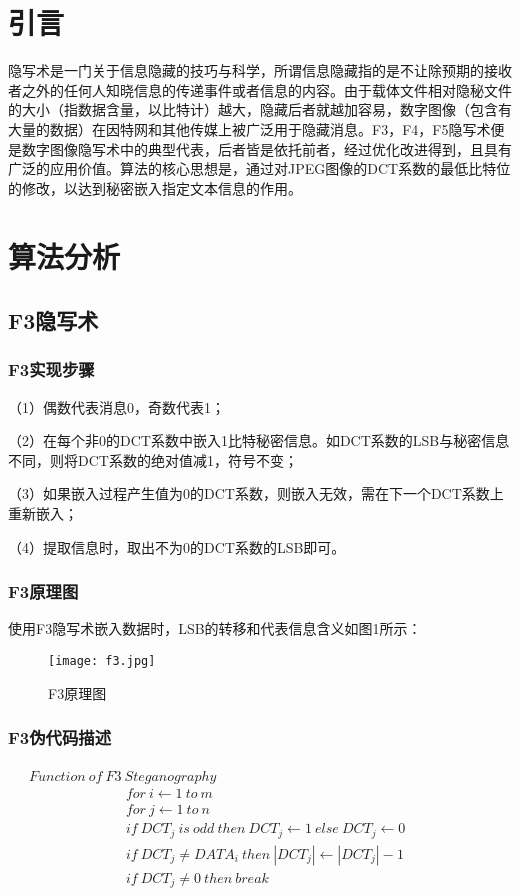 \documentclass[onecolumn,a4paper,12pt]{article}
\begin{document}
\section{引言}

隐写术是一门关于信息隐藏的技巧与科学，所谓信息隐藏指的是不让除预期的接收者之外的任何人知晓信息的传递事件或者信息的内容。由于载体文件相对隐秘文件的大小（指数据含量，以比特计）越大，隐藏后者就越加容易，数字图像（包含有大量的数据）在因特网和其他传媒上被广泛用于隐藏消息。F3，F4，F5隐写术便是数字图像隐写术中的典型代表，后者皆是依托前者，经过优化改进得到，且具有广泛的应用价值。算法的核心思想是，通过对JPEG图像的DCT系数的最低比特位的修改，以达到秘密嵌入指定文本信息的作用。

\section{算法分析}

\subsection{F3隐写术}

\subsubsection{F3实现步骤}

（1）偶数代表消息0，奇数代表1；

（2）在每个非0的DCT系数中嵌入1比特秘密信息。如DCT系数的LSB与秘密信息不同，则将DCT系数的绝对值减1，符号不变；

（3）如果嵌入过程产生值为0的DCT系数，则嵌入无效，需在下一个DCT系数上重新嵌入；

（4）提取信息时，取出不为0的DCT系数的LSB即可。

\subsubsection{F3原理图}

使用F3隐写术嵌入数据时，LSB的转移和代表信息含义如图1所示：

\begin{figure}[H]
  \centering
  \texttt{[image: f3.jpg]}\\
  \caption{F3原理图}\label{F3原理图}
\end{figure}

\subsubsection{F3伪代码描述}
\qquad\qquad\ \ \ $Function\ of\ F3\ Steganography$
\begin{align*}
& for\ i \gets 1\ to\ m \\
& for\ j \gets 1\ to\ n \\
& if\ DCT_j\ is\ odd\ then\ DCT_j \gets 1\ else\ DCT_j \gets 0 \\
& if\ DCT_j\not=DATA_i\ then\ \left|DCT_j\right| \gets \left|DCT_j\right|-1 \\
& if\ DCT_j\not=0\ then\ break
\end{align*}
\end{document}
